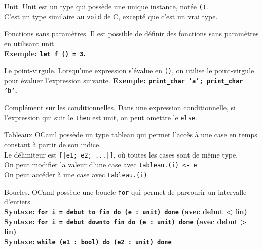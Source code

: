 \documentclass[french, 11pt]{article}
\begin{document}
\begin{defi}{Unit.}{}
    Unit est un type qui possède une unique instance, notée \texttt{()}.\\
    C'est un type similaire au \texttt{void} de C, excepté que c'est un vrai type.
\end{defi}

\begin{defi}{Fonctions sans paramètres.}{}
    Il est possible de définir des fonctions sans paramètres en utilisant unit.\\
    \bf{Exemple:} \texttt{let f () = 3}.
\end{defi}

\begin{defi}{Le point-virgule.}{}
    Lorsqu'une expression s'évalue en \texttt{()}, on utilise le point-virgule pour évaluer l'expression suivante.\n
    \bf{Exemple:} \texttt{print\_char 'a'; print\_char 'b'}.
\end{defi}

\begin{defi}{Complément sur les conditionnelles.}{}
    Dans une expression conditionnelle, si l'expression qui suit le \texttt{then} est unit, on peut omettre le \texttt{else}.
\end{defi}

\begin{defi}{Tableaux}{}
    OCaml possède un type tableau qui permet l'accès à une case en temps constant à partir de son indice.\\
    Le délimiteur est \texttt{[|e1; e2; ...|]}, où toutes les cases sont de même type.\\
    On peut modifier la valeur d'une case avec \texttt{tableau.(i) <- e}\\
    On peut accéder à une case avec \texttt{tableau.(i)}
\end{defi}

\begin{defi}{Boucles.}{}
    OCaml possède une boucle \texttt{for} qui permet de parcourir un intervalle d'entiers.\\
    \bf{Syntaxe:} \texttt{for i = debut to fin do (e : unit) done} (avec debut < fin)\\
    \bf{Syntaxe:} \texttt{for i = debut downto fin do (e : unit) done} (avec debut > fin)\\
    \bf{Syntaxe:} \texttt{while (e1 : bool) do (e2 : unit) done}
\end{defi}
\end{document}
